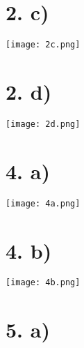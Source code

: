 \documentclass{article}
\begin{document}
\section*{2. c)}

\begin{center}
    \texttt{[image: 2c.png]}
\end{center}

\section*{2. d)}

\begin{center}
    \texttt{[image: 2d.png]}
\end{center}

\section*{4. a)}

\begin{center}
    \texttt{[image: 4a.png]}
\end{center}

\section*{4. b)}

\begin{center}
    \texttt{[image: 4b.png]}
\end{center}

\section*{5. a)}
\end{document}
